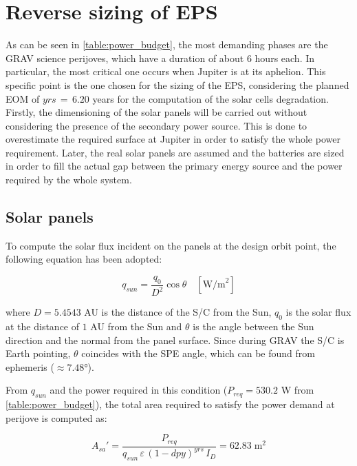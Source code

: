 \section{Reverse sizing of EPS}
\label{sec:EPS_sizing}

As can be seen in \autoref{table:power_budget}, the most demanding phases are the GRAV science perijoves, which have a duration of about 6 hours each. In particular, the most critical one occurs when Jupiter is at its aphelion.
This specific point is the one chosen for the sizing of the EPS, considering the planned EOM of $yrs \, = \, 6.20$ years for the computation of the solar cells degradation.
Firstly, the dimensioning of the solar panels will be carried out without considering the presence of the secondary power source.
This is done to overestimate the required surface at Jupiter in order to satisfy the whole power requirement.
Later, the real solar panels are assumed and the batteries are sized in order to fill the actual gap between the primary energy source and the power required by the whole system. 


\subsection{Solar panels}
\label{subsec:solar_panels_sizing}

To compute the solar flux incident on the panels at the design orbit point, the following equation has been adopted:

\begin{equation}
    q_{sun} = \frac{q_0}{D^2} \cos \theta \quad [ \textrm{W/m}^2 ]
\end{equation}

where $D = 5.4543$ AU is the distance of the S/C from the Sun, $q_0$ is the solar flux at the distance of $1$ AU from the Sun and $\theta$ is the angle between the Sun direction and the normal from the panel surface.
Since during GRAV the S/C is Earth pointing, $\theta$ coincides with the SPE angle, which can be found from ephemeris ($\approx 7.48$°).

From $q_{sun}$ and the power required in this condition ($P_{req} = 530.2$ W from \autoref{table:power_budget}), the total area required to satisfy the power demand at perijove is computed as:

\begin{equation}
    A_{sa}' = \frac{P_{req}}{q_{sun} \, \varepsilon \, \left( 1 - dpy \right) ^ {yrs} \, I_D} = 62.83 \; \textrm{m}^2
    \label{eq:A_sa}
\end{equation}


